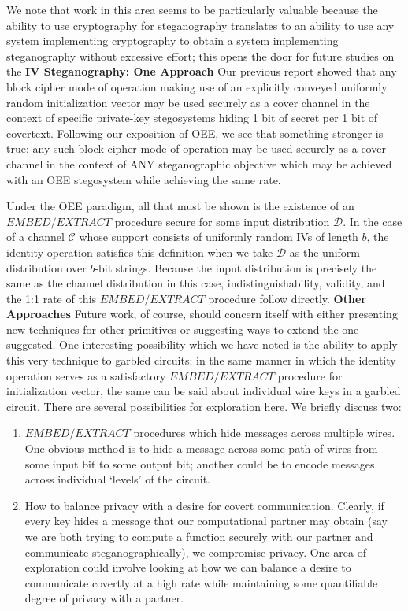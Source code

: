 \documentclass{article}
\begin{document}
We note that work in this area seems to be particularly valuable because 
the ability to use cryptography for steganography translates to an ability to 
use any system implementing cryptography to obtain a system implementing steganography 
without excessive effort; this opens the door for future studies on the 
\newline\newline 
\textbf{IV Steganography: One Approach } Our previous report showed that any block cipher mode of operation  
making use of an explicitly conveyed uniformly random initialization vector 
may be used 
securely as a cover channel in the context of specific private-key 
stegosystems hiding 1 bit of secret per 1 bit of covertext.  Following our exposition of OEE, we see that something 
stronger is true: any such block cipher mode of operation may 
be used securely as a cover channel in the context of ANY steganographic 
objective which may be achieved with an OEE stegosystem while achieving 
the same rate.

Under the OEE paradigm, all that must be shown is the existence of an 
$EMBED/EXTRACT$ procedure secure for some input distribution 
$\mathcal{D}$. In the case of a channel $\mathcal{C}$ whose support consists of  
uniformly random IVs of length $b$, the identity operation satisfies this definition
when we take $\mathcal{D}$ as the uniform distribution over $b$-bit strings.  
Because the input distribution is precisely the same as the channel distribution 
in this case, indistinguishability, validity, and the 1:1 rate of this
$EMBED/EXTRACT$ procedure follow directly. 
\newline\newline
\textbf{Other Approaches }  Future work, of course, should concern 
itself with either presenting new techniques for other primitives or suggesting 
ways to extend the one suggested.  One interesting possibility which we have 
noted is the ability to apply this very technique to garbled circuits: in the 
same manner in which the identity operation serves as a satisfactory 
$EMBED/EXTRACT$ procedure for initialization vector, the same can be 
said about individual wire keys in a garbled circuit.  There are several 
possibilities for exploration here.  We briefly discuss two:

\begin{enumerate}
\item{$EMBED/EXTRACT$ procedures which hide messages across multiple wires.
One obvious method is to hide a message across some path of wires from some 
input bit to some output bit; another could be to encode messages across 
individual `levels' of the circuit.}
\item{How to balance privacy with a desire for covert communication.  Clearly,
if every key hides a message that our computational partner may obtain 
(say we are both trying to compute a function securely with our partner and 
communicate steganographically), we compromise privacy.  One area of exploration 
could involve looking at how we can balance a desire to communicate covertly at a 
high rate while maintaining some quantifiable degree of privacy with a partner.}
\end{enumerate}
\end{document}
